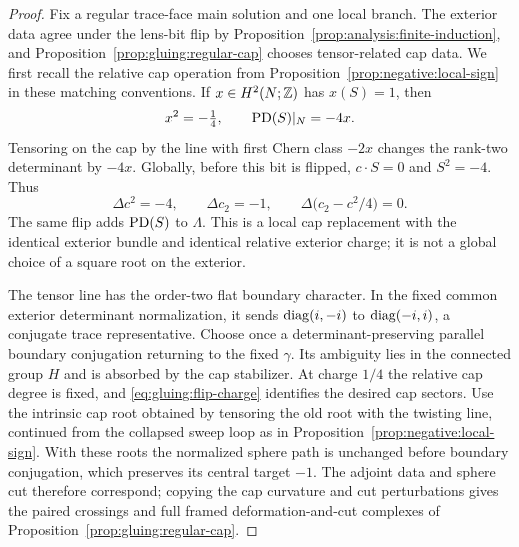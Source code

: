 \begin{proof}
Fix a regular trace-face main solution and one local branch.  The
exterior data agree under the lens-bit flip by
Proposition~\ref{prop:analysis:finite-induction}, and
Proposition~\ref{prop:gluing:regular-cap} chooses tensor-related cap
data.  We first recall the relative cap operation from
Proposition~\ref{prop:negative:local-sign} in these matching conventions.
If $x\in H^2(N;\mathbb Z)$ has $x(S)=1$, then
\[
 x^2=-\tfrac14,\qquad \operatorname{PD}(S)|_N=-4x.
\]
Tensoring on the cap by the line with first Chern class $-2x$
changes the rank-two determinant by $-4x$.
Globally, before this bit is flipped, $c\cdot S=0$ and
$S^2=-4$.  Thus
\begin{equation}
 \Delta c^2=-4,
 \qquad \Delta c_2=-1,
 \qquad \Delta\bigl(c_2-c^2/4\bigr)=0.
 \label{eq:gluing:flip-charge}
\end{equation}
The same flip adds $\operatorname{PD}(S)$ to $\Lambda$.  This is a local cap
replacement with the identical exterior bundle and identical
relative exterior charge; it is not a global choice of a
square root on the exterior.

The tensor line has the order-two flat boundary character.  In
the fixed common exterior determinant normalization, it
sends $\operatorname{diag}(i,-i)$ to $\operatorname{diag}(-i,i)$, a conjugate trace
representative.  Choose once a determinant-preserving parallel
boundary conjugation returning to the fixed $\gamma$.
Its ambiguity lies in the connected group $H$ and is absorbed
by the cap stabilizer.  At charge $1/4$ the relative cap degree
is fixed, and \eqref{eq:gluing:flip-charge} identifies the desired
cap sectors.  Use the intrinsic cap root obtained by tensoring
the old root with the twisting line, continued from the collapsed
sweep loop as in Proposition~\ref{prop:negative:local-sign}.
With these roots the normalized sphere path is unchanged before
boundary conjugation, which preserves its central target $-1$.
The adjoint data and sphere cut therefore correspond; copying
the cap curvature and cut perturbations gives the paired crossings
and full framed deformation-and-cut complexes of
Proposition~\ref{prop:gluing:regular-cap}.


\end{proof}
